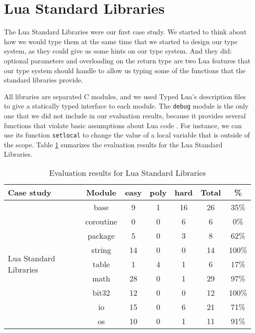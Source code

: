 \section{Lua Standard Libraries}

The Lua Standard Libraries \citep{luamanual} were our first case study.
We started to think about how we would type them at the same time that
we started to design our type system, as they could give us some hints
on our type system.
And they did: optional parameters and overloading on the return type
are two Lua features that our type system should handle to allow us
typing some of the functions that the standard libraries provide.

All libraries are separated C modules, and we used Typed Lua's description
files to give a statically typed interface to each module.
The \texttt{debug} module is the only one that we did not include in our
evaluation results, because it provides several functions that violate
basic assumptions about Lua code \citep{luamanual}.
For instance, we can use its function \texttt{setlocal} to change the value
of a local variable that is outside of the scope.
Table \ref{tab:evallsl} sumarizes the evaluation results for the Lua Standard Libraries.

\begin{table}[!ht]
\begin{center}
\begin{tabular}{|l|c|c|c|c|c|c|}
\hline
\textbf{Case study} & \textbf{Module} & \textbf{easy} & \textbf{poly} & \textbf{hard} & \textbf{Total} & \textbf{\%} \\
\hline
\multirow{9}{*}{Lua Standard Libraries}
& base & 9 & 1 & 16 & 26 & 35\% \\
\cline{2-7}
& coroutine & 0 & 0 & 6 & 6 & 0\% \\
\cline{2-7}
& package & 5 & 0 & 3 & 8 & 62\% \\
\cline{2-7}
& string & 14 & 0 & 0 & 14 & 100\% \\
\cline{2-7}
& table & 1 & 4 & 1 & 6 & 17\% \\
\cline{2-7}
& math & 28 & 0 & 1 & 29 & 97\% \\
\cline{2-7}
& bit32 & 12 & 0 & 0 & 12 & 100\% \\
\cline{2-7}
& io & 15 & 0 & 6 & 21 & 71\% \\
\cline{2-7}
& os & 10 & 0 & 1 & 11 & 91\% \\
\hline
\end{tabular}
\end{center}
\caption{Evaluation results for Lua Standard Libraries}
\label{tab:evallsl}
\end{table}

